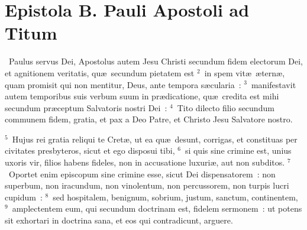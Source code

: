 {\centering \section*{Epistola B. Pauli Apostoli ad Titum}}\thispagestyle{empty}

~Paulus servus Dei, Apostolus autem Jesu Christi secundum fidem electorum Dei, et agnitionem veritatis, qu\ae\ secundum pietatem est
${}^{2}$~in spem vit\ae\ \ae tern\ae , quam promisit qui non mentitur, Deus, ante tempora s\ae cularia~:
${}^{3}$~manifestavit autem temporibus suis verbum suum in pr\ae dicatione, qu\ae\ credita est mihi secundum pr\ae ceptum Salvatoris nostri Dei~:
${}^{4}$~Tito dilecto filio secundum communem fidem, gratia, et pax a Deo Patre, et Christo Jesu Salvatore nostro.


${}^{5}$~Hujus rei gratia reliqui te Cret\ae , ut ea qu\ae\ desunt, corrigas, et constituas per civitates presbyteros, sicut et ego disposui tibi,
${}^{6}$~si quis sine crimine est, unius uxoris vir, filios habens fideles, non in accusatione luxuri\ae , aut non subditos.
${}^{7}$~Oportet enim episcopum sine crimine esse, sicut Dei dispensatorem~: non superbum, non iracundum, non vinolentum, non percussorem, non turpis lucri cupidum~:
${}^{8}$~sed hospitalem, benignum, sobrium, justum, sanctum, continentem,
${}^{9}$~amplectentem eum, qui secundum doctrinam est, fidelem sermonem~: ut potens sit exhortari in doctrina sana, et eos qui contradicunt, arguere.


